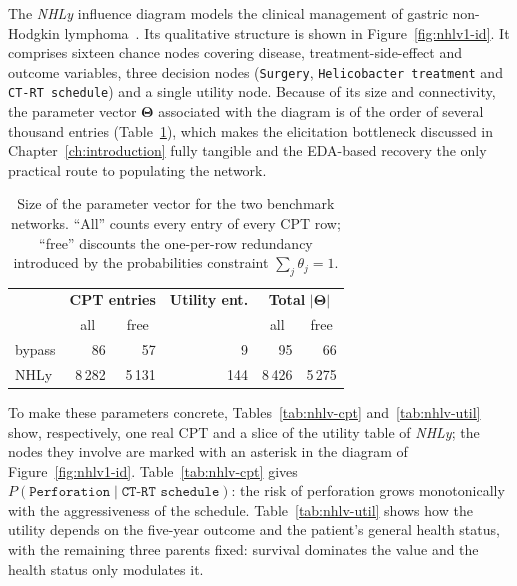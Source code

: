 The \emph{NHLy} influence diagram models the clinical management of
gastric non-Hodgkin lymphoma~\cite{boot1998gastric}. Its qualitative structure is shown in
Figure~\ref{fig:nhlv1-id}. It comprises sixteen chance nodes
covering disease, treatment-side-effect and outcome variables, three
decision nodes (\texttt{Surgery}, \texttt{Helicobacter treatment} and
\texttt{CT-RT schedule}) and a single utility node. Because of its
size and connectivity, the parameter vector
$\boldsymbol{\Theta}$ associated with the diagram is of the order of
several thousand entries (Table~\ref{tab:benchmark-sizes}), which makes the elicitation bottleneck
discussed in Chapter~\ref{ch:introduction} fully tangible and the
EDA-based recovery the only practical route to populating the
network.
\\

\begin{table}[h]
\centering
\begin{tabular}{l|rr|r|rr}
\hline
& \multicolumn{2}{c|}{\textbf{CPT entries}} & \textbf{Utility ent.}
& \multicolumn{2}{c}{\textbf{Total} $|\boldsymbol{\Theta}|$}\\
& \multicolumn{1}{c}{all} & \multicolumn{1}{c|}{free} & &
  \multicolumn{1}{c}{all} & \multicolumn{1}{c}{free}\\
\hline
bypass &     86 &    57 &   9 &     95 &     66 \\
NHLy   & 8\,282 & 5\,131 & 144 & 8\,426 & 5\,275 \\
\hline
\end{tabular}
\caption{Size of the parameter vector for the two benchmark networks.
``All'' counts every entry of every CPT row; ``free'' discounts the
one-per-row redundancy introduced by the probabilities constraint
$\sum_j\theta_j=1$.}
\label{tab:benchmark-sizes}
\end{table}

\newpage

To make these parameters concrete, Tables~\ref{tab:nhlv-cpt}
and~\ref{tab:nhlv-util} show, respectively, one real CPT and a slice of the
utility table of \emph{NHLy}; the nodes they involve are marked with an asterisk
in the diagram of Figure~\ref{fig:nhlv1-id}. Table~\ref{tab:nhlv-cpt} gives
$P(\texttt{Perforation}\mid\texttt{CT-RT schedule})$: the risk of perforation
grows monotonically with the aggressiveness of the schedule.
Table~\ref{tab:nhlv-util} shows how the utility depends on the five-year outcome
and the patient's general health status, with the remaining three parents fixed:
survival dominates the value and the health status only modulates it.

